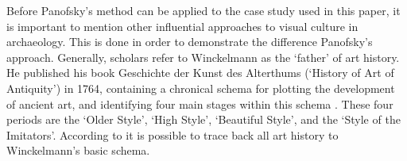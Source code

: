 Before Panofsky’s method can be applied to the case study used in this paper, it is important to mention other influential approaches to visual culture in archaeology. 
This is done in order to demonstrate the difference Panofsky’s approach. Generally, scholars refer to Winckelmann as the ‘father’ of art history. 
He published his book Geschichte der Kunst des Alterthums (‘History of Art of Antiquity’) in 1764, containing a chronical schema for plotting the development of ancient art, and identifying four main stages within this schema \parencite[68--69] {BeardHenderson_2001}. 
These four periods are the ‘Older Style’, ‘High Style’, ‘Beautiful Style’, and the ‘Style of the Imitators’. 
According to \textcite {BeardHenderson_2001}  it is possible to trace back all art history to Winckelmann’s basic schema.

